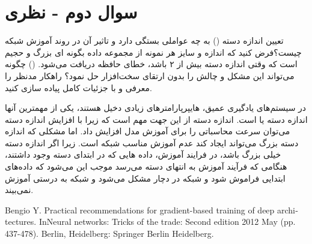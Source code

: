 \section{سوال دوم - نظری}
تعیین اندازه دسته () به چه عواملی بستگی دارد و تاثیر آن در روند آموزش شبکه چیست؟فرض کنید که اندازه و سایز هر نمونه از مجموعه داده بگونه ای بزرگ و حجیم است که وقتی اندازه دسته بیش از ۲ باشد، خطای حافظه دریافت می‌شود. () چگونه می‌تواند این مشکل و چالش را بدون ارتقای سخت‌افزار حل نمود؟ راهکار مدنظر را معرفی و با جزئیات کامل پیاده سازی کنید.







\begin{qsolve}
	در سیستم‌های یادگیری عمیق، هایپرپارامتر‌های زیادی دخیل هستند، یکی از مهمترین آنها اندازه دسته یا  است. \cite{ref1} اندازه دسته از این جهت مهم است که زیرا با افزایش اندازه دسته می‌توان سرعت محاسباتی را برای آموزش مدل افزایش داد. اما مشکلی که اندازه دسته بزرگ می‌تواند ایجاد کند عدم آموزش مناسب شبکه است. زیرا اگر اندازه دسته خیلی بزرگ باشد، در فرایند آموزش، داده هایی که در ابتدای دسته وجود داشتند، هنگامی که فرآیند آموزش به انتهای دسته می‌رسد موجب این می‌شود که داده‌های ابتدایی فراموش شود و شبکه در  دچار مشکل می‌شود و شبکه به درستی آموزش نمی‌بیند.
	
	\begin{latin}
		\begin{thebibliography}{9}
			Bengio Y. Practical recommendations for gradient-based training of deep architectures. InNeural networks: Tricks of the trade: Second edition 2012 May (pp. 437-478). Berlin, Heidelberg: Springer Berlin Heidelberg.
			
		\end{thebibliography} 
	\end{latin}
	

	
\end{qsolve}




























